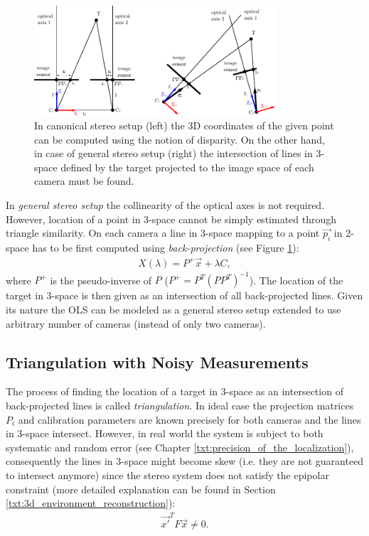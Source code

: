 \begin{figure}[tbh]
	\centering
	\includegraphics[width=0.8\textwidth]{fig/canonical_stereo_vs_general_stereo.pdf}
	\caption{In canonical stereo setup (left) the 3D coordinates of the given point can be computed using the notion of disparity. On the other hand, in case of general stereo setup (right) the intersection of lines in 3-space defined by the target projected to the image space of each camera must be found.}
	\label{fig:canonical_vs_general_stereo}
\end{figure}

In \textit{general stereo setup} the collinearity of the optical axes is not required. However, location of a point in 3-space cannot be simply estimated through triangle similarity. On each camera a line in 3-space mapping to a point $\vec{p_{i}}$ in 2-space has to be first computed using \textit{back-projection} (see Figure \ref{fig:canonical_vs_general_stereo}):
\begin{align}
	X(\lambda) = P^{+}\vec{x} + \lambda C,
\end{align}
where $P^{+}$ is the pseudo-inverse of $P$ ($P^{+} = P^{T}(PP^{T})^{-1}$). The location of the target in 3-space is then given as an intersection of all back-projected lines. Given its nature the OLS can be modeled as a general stereo setup extended to use arbitrary number of cameras (instead of only two cameras).

\subsection{Triangulation with Noisy Measurements} \label{txt:triangulation_with_noisy_measurements}

The process of finding the location of a target in 3-space as an intersection of back-projected lines is called \textit{triangulation}. In ideal case the projection matrices $P_{i}$ and calibration parameters are known precisely for both cameras and the lines in 3-space intersect. However, in real world the system is subject to both systematic and random error (see Chapter \ref{txt:precision_of_the_localization}), consequently the lines in 3-space might become skew (i.e. they are not guaranteed to intersect anymore) since the stereo system does not satisfy the epipolar constraint \cite{Hartley:2003:MVG:861369} (more detailed explanation can be found in Section \ref{txt:3d_environment_reconstruction}):
\begin{align}
	\vec{x'}^{T}F\vec{x} \neq 0.
\end{align}

